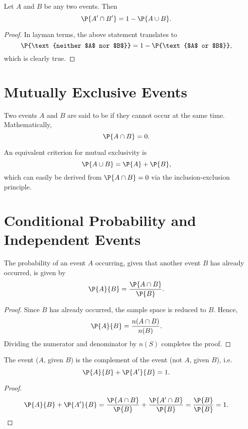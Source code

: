 \begin{proposition}
    Let $A$ and $B$ be any two events. Then \[\P{A' \cap B'} = 1 - \P{A \cup B}.\]
\end{proposition}
\begin{proof}
    In layman terms, the above statement translates to \[\P{\text{neither $A$ nor $B$}} = 1 - \P{\text{$A$ or $B$}},\] which is clearly true.
\end{proof}

\section{Mutually Exclusive Events}

\begin{definition}
    Two events $A$ and $B$ are said to be  if they cannot occur at the same time. Mathematically, \[\P{A \cap B} = 0.\]
\end{definition}

An equivalent criterion for mutual exclusivity is \[\P{A \cup B} = \P{A} + \P{B},\] which can easily be derived from $\P{A \cap B} = 0$ via the inclusion-exclusion principle.

\section{Conditional Probability and Independent Events}

\begin{proposition}
    The probability of an event $A$ occurring, given that another event $B$ has already occurred, is given by \[\P{A}{B} = \frac{\P{A \cap B}}{\P{B}}.\]
\end{proposition}
\begin{proof}
    Since $B$ has already occurred, the sample space is reduced to $B$. Hence, \[\P{A}{B} = \frac{n(A \cap B)}{n(B)}.\] Dividing the numerator and denominator by $n(S)$ completes the proof.
\end{proof}

\begin{corollary}
    The event ($A$, given $B$) is the complement of the event (not $A$, given $B$), i.e. \[\P{A}{B} + \P{A'}{B} = 1.\]
\end{corollary}
\begin{proof}
    \[\P{A}{B} + \P{A'}{B} = \frac{\P{A \cap B}}{\P{B}} + \frac{\P{A' \cap B}}{\P{B}} = \frac{\P{B}}{\P{B}} = 1.\]
\end{proof}

